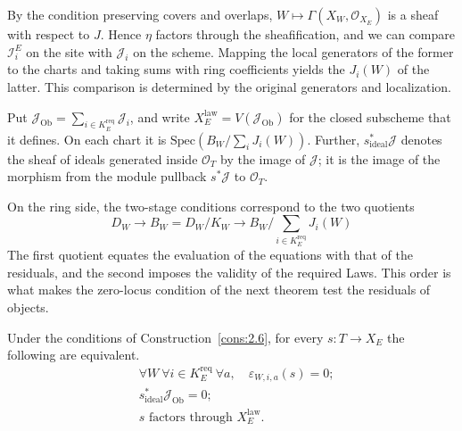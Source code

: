 By the condition preserving covers and overlaps, $W\mapsto\Gamma(X_W,\mathcal{O}_{X_E})$
is a sheaf with respect to $J$. Hence $\eta$ factors through the sheafification, and we can
compare $\mathcal{I}_i^E$ on the site with $\mathcal{J}_i$ on the scheme. Mapping the local
generators of the former to the charts and taking sums with ring coefficients yields the
$J_i(W)$ of the latter. This comparison is determined by the original generators and
localization.

\begin{definition}\label{def:2.8}

Put $\mathcal{J}_{\mathrm{Ob}}=\sum_{i\in K_E^{\mathrm{req}}}\mathcal{J}_i$, and write
$X_E^{\mathrm{law}}=V(\mathcal{J}_{\mathrm{Ob}})$ for the closed subscheme that it defines.
On each chart it is $\mathrm{Spec}(B_W/\sum_iJ_i(W))$. Further,
$s^{*}_{\mathrm{ideal}}\mathcal{J}$ denotes the sheaf of ideals generated inside
$\mathcal{O}_T$ by the image of $\mathcal{J}$; it is the image of the morphism from the
module pullback $s^*\mathcal{J}$ to $\mathcal{O}_T$.

On the ring side, the two-stage conditions correspond to the two quotients
\[
D_W\longrightarrow B_W=D_W/K_W
\longrightarrow B_W/\sum_{i\in K_E^{\mathrm{req}}}J_i(W)
\]
The first quotient equates the evaluation of the equations with that of the residuals, and
the second imposes the validity of the required Laws. This order is what makes the
zero-locus condition of the next theorem test the residuals of objects.

\end{definition}

\begin{theorem}\label{thm:2.9}

Under the conditions of Construction~\ref{cons:2.6}, for every $s:T\to X_E$ the following
are equivalent.
\begin{equation*}
\begin{aligned}
&\forall W\ \forall i\in K_E^{\mathrm{req}}\ \forall a,
\quad\varepsilon_{W,i,a}(s)=0;\\
&s^{*}_{\mathrm{ideal}}\mathcal{J}_{\mathrm{Ob}}=0;\\
&s\text{ factors through }X_E^{\mathrm{law}}\text{.}
\end{aligned}
\tag{2.7}\label{eq:2.7}
\end{equation*}

\end{theorem}

